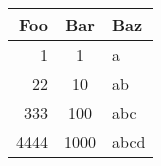 \begin{tabular}{rcl}
\toprule
Foo & Bar & Baz \\
\midrule
1 & 1 & a \\
22 & 10 & ab \\
333 & 100 & abc \\
4444 & 1000 & abcd \\
\bottomrule
\end{tabular}